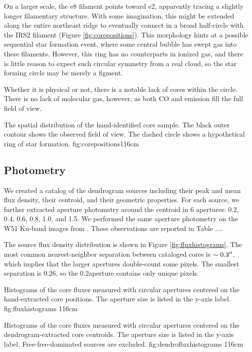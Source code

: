 \documentclass{aa}
\begin{document}
On a larger scale, the e8 filament points toward e2, apparently tracing a
slightly longer filamentary structure.  With some imagination, this might be
extended along the entire northeast ridge to eventually connect in a broad
half-circle with the IRS2 filament (Figure \ref{fig:corepositions}).  This
morphology hints at a possible sequential star formation event, where some
central bubble has swept gas into these filaments.  However, this ring has no
counterparts in ionized gas, and there is little reason to expect such circular
symmetry from a real cloud, so the star forming circle may be merely a figment.

Whether it is physical or not, there is a notable lack of cores within the
circle.  There is no lack of molecular gas, however, as both CO and \formaldehyde
emission fill the full field of view.

{The spatial distribution of the hand-identified core sample.
The black outer contour shows the observed field of view.
The dashed circle shows a hypothetical ring of star formation.
}{fig:corepositions}{1}{16cm}

\subsection{Photometry}
We created a catalog of the dendrogram sources including their peak and mean
flux density, their centroid, and their geometric properties.  For each source,
we further extracted aperture photometry around the centroid in 6 apertures:
0.2, 0.4, 0.6, 0.8, 1.0, and 1.5\arcsec.  We performed the same aperture
photometry on the W51 Ku-band images from \citet{Ginsburg2016a}.  These
observations are reported in Table {...}.

The source flux density distribution is shown in Figure
\ref{fig:fluxhistograms}.  The most common nearest-neighbor separation between
cataloged cores is $\sim0.3\mbox{$^{\prime\prime}$}$, which implies that the larger apertures
double-count some pixels.  The smallest separation is
0.26\arcsec, so the 0.2\arcsec aperture contains only unique pixels.

{Histograms of the core fluxes measured with circular apertures centered
on the hand-extracted core positions.  The aperture size is listed 
in the y-axis label.}
{fig:fluxhistograms}
{1}{16cm}

{Histograms of the core fluxes measured with circular apertures centered
on the dendrogram-extracted core centroids.  The aperture size is listed 
in the y-axis label.  Free-free-dominated sources are excluded.}
{fig:dendrofluxhistograms}
{1}{16cm}
\end{document}
